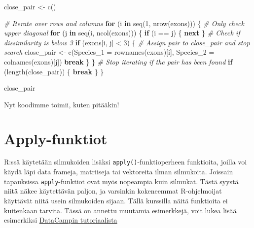 \documentclass[
]{book}
\newenvironment{Shaded}{\begin{snugshade}}{\end{snugshade}}
\newcommand{\AttributeTok}[1]{\textcolor[rgb]{0.77,0.63,0.00}{#1}}
\newcommand{\CommentTok}[1]{\textcolor[rgb]{0.56,0.35,0.01}{\textit{#1}}}
\newcommand{\ControlFlowTok}[1]{\textcolor[rgb]{0.13,0.29,0.53}{\textbf{#1}}}
\newcommand{\DecValTok}[1]{\textcolor[rgb]{0.00,0.00,0.81}{#1}}
\newcommand{\FunctionTok}[1]{\textcolor[rgb]{0.00,0.00,0.00}{#1}}
\newcommand{\NormalTok}[1]{#1}
\newcommand{\OtherTok}[1]{\textcolor[rgb]{0.56,0.35,0.01}{#1}}
\newcommand{\SpecialCharTok}[1]{\textcolor[rgb]{0.00,0.00,0.00}{#1}}
\begin{document}
\begin{Shaded}
\begin{Highlighting}[]
\NormalTok{close\_pair }\OtherTok{\textless{}{-}} \FunctionTok{c}\NormalTok{()}

\CommentTok{\# Iterate over rows and columns}
\ControlFlowTok{for}\NormalTok{ (i }\ControlFlowTok{in} \FunctionTok{seq}\NormalTok{(}\DecValTok{1}\NormalTok{, }\FunctionTok{nrow}\NormalTok{(exons))) \{}
  \CommentTok{\# Only check upper diagonal}
  \ControlFlowTok{for}\NormalTok{ (j }\ControlFlowTok{in} \FunctionTok{seq}\NormalTok{(i, }\FunctionTok{ncol}\NormalTok{(exons))) \{}
    \ControlFlowTok{if}\NormalTok{ (i }\SpecialCharTok{==}\NormalTok{ j) \{}
        \ControlFlowTok{next}
\NormalTok{    \}}
    \CommentTok{\# Check if dissimilarity is below 3}
    \ControlFlowTok{if}\NormalTok{ (exons[i, j] }\SpecialCharTok{\textless{}} \DecValTok{3}\NormalTok{) \{}
      \CommentTok{\# Assign pair to close\_pair and stop search}
\NormalTok{      close\_pair }\OtherTok{\textless{}{-}} \FunctionTok{c}\NormalTok{(}\AttributeTok{Species\_1 =} \FunctionTok{rownames}\NormalTok{(exons)[i],}
                            \AttributeTok{Species\_2 =} \FunctionTok{colnames}\NormalTok{(exons)[j])}
      \ControlFlowTok{break}
\NormalTok{    \}}
\NormalTok{  \}}
  \CommentTok{\# Stop iterating if the pair has been found}
  \ControlFlowTok{if}\NormalTok{ (}\FunctionTok{length}\NormalTok{(close\_pair)) \{}
    \ControlFlowTok{break}
\NormalTok{  \}}
\NormalTok{\}}

\NormalTok{close\_pair}
\end{Highlighting}
\end{Shaded}

Nyt koodimme toimii, kuten pitääkin!

\hypertarget{apply-funktiot}{%
\section{Apply-funktiot}\label{apply-funktiot}}

R:ssä käytetään silmukoiden lisäksi \texttt{apply()}-funktioperheen funktioita, joilla voi käydä läpi data frameja, matriiseja tai vektoreita ilman silmukoita. Joissain tapauksissa \texttt{apply}-funktiot ovat myös nopeampia kuin silmukat. Tästä syystä niitä näkee käytettävän paljon, ja varsinkin kokeneemmat R-ohjelmoijat käyttävät niitä usein silmukoiden sijaan. Tällä kurssilla näitä funktioita ei kuitenkaan tarvita. Tässä on annettu muutamia esimerkkejä, voit lukea lisää esimerkiksi \href{https://www.datacamp.com/community/tutorials/r-tutorial-apply-family}{DataCampin tutoriaalista}
\end{document}
